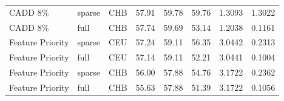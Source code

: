 \documentclass[11pt]{article}
\begin{document}
\begin{table}
\begin{tabular}{lll|crr|cc}
          CADD 8\% &            sparse &          CHB &                        57.91 &             59.78 &            59.76 &                                 1.3093 &                                1.3022 \\
          CADD 8\% &              full &          CHB &                        57.74 &             59.69 &            53.14 &                                 1.2038 &                                0.1161 \\
  Feature Priority &            sparse &          CEU &                        57.24 &             59.11 &            56.35 &                                 3.0442 &                                0.2313 \\
  Feature Priority &              full &          CEU &                        57.14 &             59.11 &            52.21 &                                 3.0441 &                                0.1004 \\
  Feature Priority &            sparse &          CHB &                        56.00 &             57.88 &            54.76 &                                 3.1722 &                                0.2362 \\
  Feature Priority &              full &          CHB &                        55.63 &             57.88 &            51.39 &                                 3.1722 &                                0.1056 \\
\end{tabular}
\end{table}
\end{document}

